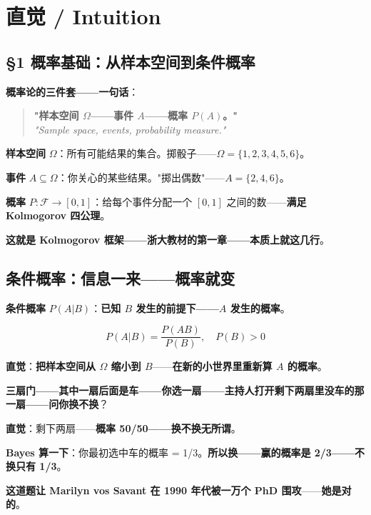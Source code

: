 \section{直觉 / Intuition}

\subsection{§1 概率基础：从样本空间到条件概率}

\textbf{概率论的三件套——一句话}：

\begin{quote}
\textbf{"样本空间 $\Omega$——事件 $A$——概率 $P(A)$。"}\\[4pt]
\itshape "Sample space, events, probability measure."
\end{quote}

\textbf{样本空间} $\Omega$：所有可能结果的集合。掷骰子——$\Omega = \{1,2,3,4,5,6\}$。

\textbf{事件} $A \subseteq \Omega$：你关心的某些结果。"掷出偶数"——$A = \{2,4,6\}$。

\textbf{概率} $P: \mathcal{F} \to [0,1]$：给每个事件分配一个 $[0,1]$ 之间的数——\textbf{满足 Kolmogorov 四公理}。

\textbf{这就是 Kolmogorov 框架——浙大教材的第一章——本质上就这几行}。

\subsection{条件概率：信息一来——概率就变}

\textbf{条件概率} $P(A|B)$：\textbf{已知 $B$ 发生的前提下——$A$ 发生的概率}。

\begin{equation}
P(A|B) = \frac{P(AB)}{P(B)}, \quad P(B) > 0
\end{equation}

\textbf{直觉}：\textbf{把样本空间从 $\Omega$ 缩小到 $B$}——\textbf{在新的小世界里重新算 $A$ 的概率}。

\begin{example}
\textbf{三扇门——其中一扇后面是车——你选一扇——主持人打开剩下两扇里没车的那一扇——问你换不换}？

\textbf{直觉}：剩下两扇——\textbf{概率 50/50——换不换无所谓}。

\textbf{Bayes 算一下}：你最初选中车的概率 = 1/3。\textbf{所以换——赢的概率是 2/3——不换只有 1/3}。

\textbf{这道题让 Marilyn vos Savant 在 1990 年代被一万个 PhD 围攻}——\textbf{她是对的}。
\end{example}

